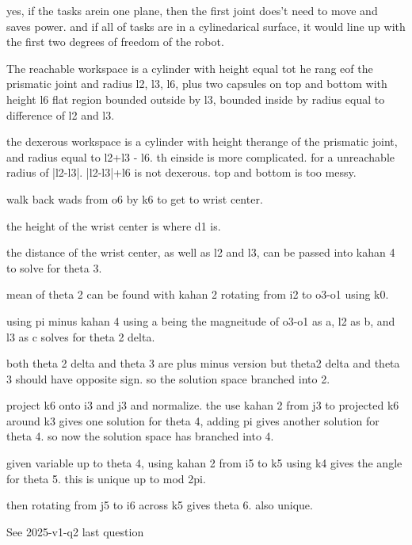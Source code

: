 \begin{solutionbox}[Q2-2]
    yes, if the tasks arein one plane, then the first joint does't need to move and saves power. and if all of tasks are in a cylinedarical surface, it would line up with the first two degrees of freedom of the robot.


    The reachable workspace is a cylinder with height equal tot he rang eof the prismatic joint and radius l2, l3, l6, plus two capsules on top and bottom with height l6 flat region bounded outside by l3, bounded inside by radius equal to difference of l2 and l3.

    the dexerous workspace is a cylinder with height therange of the prismatic joint, and radius equal to l2+l3 - l6. th einside is more complicated. for a unreachable radius of |l2-l3|. |l2-l3|+l6 is not dexerous. top and bottom is too messy.

\end{solutionbox}

\begin{solutionbox}[Q2-3]

    walk back wads from o6 by k6 to get to wrist center.

    the height of the wrist center is where d1 is.

    the distance of the wrist center, as well as l2 and l3, can be passed into kahan 4 to solve for theta 3.

    mean of theta 2 can be found with kahan 2 rotating from i2 to o3-o1 using k0.

    using pi minus kahan 4 using a being the magneitude of o3-o1 as a, l2 as b, and l3 as c solves for theta 2 delta.

    both theta 2 delta and theta 3 are plus minus version but theta2 delta and theta 3 should have opposite sign. so the solution space branched into 2.

    project k6 onto i3 and j3 and normalize. the use kahan 2 from j3 to projected k6 around k3 gives one solution for theta 4, adding pi gives another solution for theta 4. so now the solution space has branched into 4.

    given variable up to theta 4, using kahan 2 from i5 to k5 using k4 gives the angle for theta 5. this is unique up to mod 2pi.

    then rotating from j5 to i6 across k5 gives theta 6. also unique.


\end{solutionbox}

\begin{solutionbox}[Q2-4]
    See 2025-v1-q2 last question
\end{solutionbox}